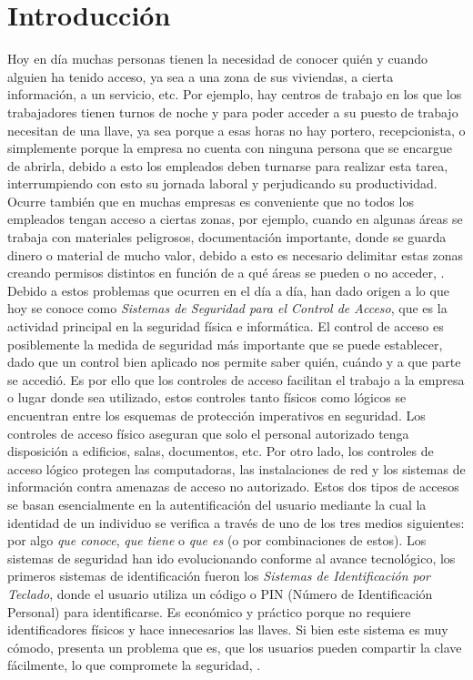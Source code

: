 \chapter{Introducción}
\setcounter{page}{1}
Hoy en día muchas personas tienen la necesidad de conocer quién y cuando alguien ha tenido acceso, ya sea a una zona de sus viviendas, a cierta información, a un servicio, etc. Por ejemplo, hay centros de trabajo en los que los trabajadores tienen turnos de noche y para poder acceder a su puesto de trabajo necesitan de una llave, ya sea porque a esas horas no hay portero, recepcionista, o simplemente porque la empresa no cuenta con ninguna persona que se encargue de abrirla, debido a esto los empleados deben turnarse para realizar esta tarea, interrumpiendo con esto su jornada laboral y perjudicando su productividad.
\vskip 0.5cm
Ocurre también que en muchas empresas es conveniente que no todos los empleados tengan acceso a ciertas zonas, por ejemplo, cuando en algunas áreas se trabaja con materiales peligrosos, documentación importante, donde se guarda dinero o material de mucho valor, debido a esto es necesario delimitar estas zonas creando permisos distintos en función de a qué áreas se pueden o no acceder, \citep{altumtec}.
\vskip 0.5cm
Debido a estos problemas que ocurren en el día a día, han dado origen a lo que hoy se conoce como \textit{Sistemas de Seguridad para el Control de Acceso}, que es la actividad principal en la seguridad física e informática. El control de acceso es posiblemente la medida de seguridad más importante que se puede establecer, dado que un control bien aplicado nos permite saber quién, cuándo y a que parte se accedió.
\vskip 0.5cm
Es por ello que los controles de acceso facilitan el trabajo a la empresa o lugar donde sea utilizado, estos controles tanto físicos como lógicos se encuentran entre los esquemas de protección imperativos en seguridad. Los controles de acceso físico aseguran que solo el personal autorizado tenga disposición a edificios, salas, documentos, etc. Por otro lado, los controles de acceso lógico protegen las computadoras, las instalaciones de red y los sistemas de información contra amenazas de acceso no autorizado. Estos dos tipos de accesos se basan esencialmente en la autentificación del usuario mediante la cual la identidad de un individuo se verifica a través de uno de los tres medios siguientes: por algo \textit{que conoce}, \textit{que tiene} o \textit{que es} (o por combinaciones de estos).
\vskip 0.5cm
Los sistemas de seguridad han ido evolucionando conforme al avance tecnológico, los primeros sistemas de identificación fueron los \textit{Sistemas de Identificación por Teclado}, donde el usuario utiliza un código o PIN (Número de Identificación Personal) para identificarse. Es económico y práctico porque no requiere identificadores físicos y hace innecesarios las llaves. Si bien este sistema es muy cómodo, presenta un problema que es, que los usuarios pueden compartir la clave fácilmente, lo que compromete la seguridad, \cite{fermax}.
